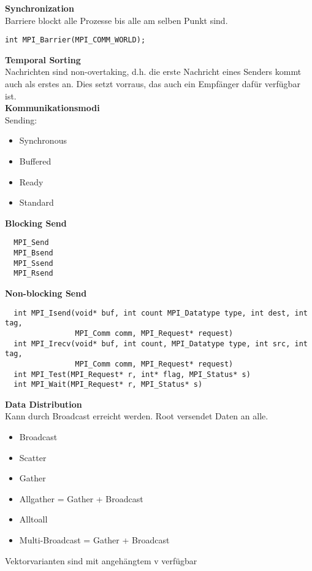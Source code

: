 \textbf{Synchronization}\\
Barriere blockt alle Prozesse bis alle am selben Punkt sind.
\begin{lstlisting}
int MPI_Barrier(MPI_COMM_WORLD);
\end{lstlisting}

\textbf{Temporal Sorting}\\
Nachrichten sind non-overtaking, d.h. die erste Nachricht eines Senders kommt auch als erstes an. Dies setzt vorraus, das auch ein
Empfänger dafür verfügbar ist.\\

\textbf{Kommunikationsmodi}\\
Sending:
\begin{itemize}
  \item Synchronous
  \item Buffered
  \item Ready
  \item Standard
  \end{itemize}
  
\textbf{Blocking Send}
\begin{lstlisting}
  MPI_Send
  MPI_Bsend
  MPI_Ssend
  MPI_Rsend
\end{lstlisting}

\newpage
\textbf{Non-blocking Send}
\begin{lstlisting}
  int MPI_Isend(void* buf, int count MPI_Datatype type, int dest, int tag, 
                MPI_Comm comm, MPI_Request* request)
  int MPI_Irecv(void* buf, int count, MPI_Datatype type, int src, int tag, 
                MPI_Comm comm, MPI_Request* request)
  int MPI_Test(MPI_Request* r, int* flag, MPI_Status* s)
  int MPI_Wait(MPI_Request* r, MPI_Status* s)
\end{lstlisting}

\textbf{Data Distribution}\\
Kann durch Broadcast erreicht werden. Root versendet Daten an alle.
\begin{itemize}
  \item Broadcast
  \item Scatter
  \item Gather
  \item Allgather = Gather + Broadcast
  \item Alltoall
  \item Multi-Broadcast = Gather + Broadcast
\end{itemize}
Vektorvarianten sind mit angehängtem v verfügbar\\

